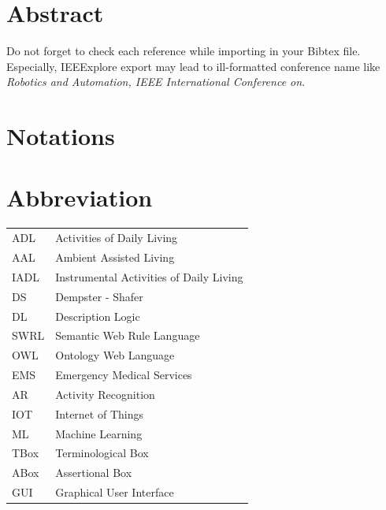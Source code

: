 \documentclass{thesisreport}
\begin{document}
  
 
\section*{Abstract}
   
 Do not forget to check each reference while importing in your Bibtex file.
 Especially, IEEExplore export may lead to ill-formatted conference name like \emph{Robotics and Automation, 
 IEEE International Conference on}.
 
 \newpage
 
 
\section*{Notations}
 
 \newpage
 
 \section*{Abbreviation}
 
 \begin{tabular}{p{2cm}p{12cm}}
 ADL & Activities of Daily Living\\
 AAL & Ambient Assisted Living \\
 IADL & Instrumental Activities of Daily Living \\
 DS & Dempster - Shafer \\
 DL & Description Logic \\
 SWRL & Semantic Web Rule Language\\
 OWL & Ontology Web Language\\
 EMS & Emergency Medical Services \\
 AR & Activity Recognition \\
 IOT & Internet of Things \\
 ML & Machine Learning \\
 TBox & Terminological Box \\
 ABox & Assertional Box \\
 GUI & Graphical User Interface \\
 \end{tabular}
 
 \newpage
 
 \listoffigures
 
\end{document}
